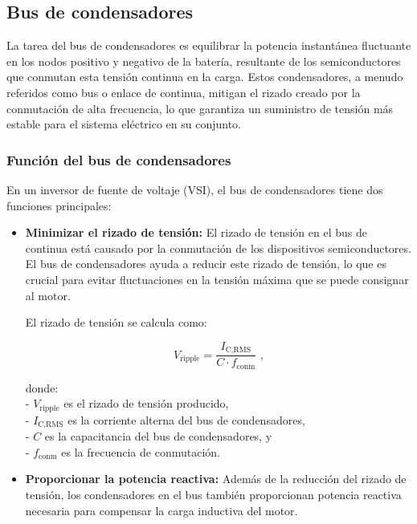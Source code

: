 \subsection{Bus de condensadores}

La tarea del bus de condensadores es equilibrar la potencia instantánea fluctuante en los nodos positivo y negativo de la batería, resultante de los semiconductores que conmutan esta tensión continua en la carga. Estos condensadores, a menudo referidos como bus o enlace de continua, mitigan el rizado creado por la conmutación de alta frecuencia, lo que garantiza un suministro de tensión más estable para el sistema eléctrico en su conjunto.

\subsubsection{Función del bus de condensadores}

En un inversor de fuente de voltaje (VSI), el bus de condensadores tiene dos funciones principales:

\begin{itemize}
	\item \textbf{Minimizar el rizado de tensión:} El rizado de tensión en el bus de continua está causado por la conmutación de los dispositivos semiconductores. El bus de condensadores ayuda a reducir este rizado de tensión, lo que es crucial para evitar fluctuaciones en la tensión máxima que se puede consignar al motor.
	
	El rizado de tensión se calcula como:
	
	\begin{equation}
	V_{\text{ripple}} = \frac{I_{\text{C,RMS}}}{C \cdot f_{\text{conm}}} \text{ ,}
	\end{equation}
	
	donde:\\
	- \( V_{\text{ripple}} \) es el rizado de tensión producido,\\
	- \( I_{\text{C,RMS}} \) es la corriente alterna del bus de condensadores,\\
	- \( C \) es la capacitancia del bus de condensadores, y\\
	- \( f_{\text{conm}} \) es la frecuencia de conmutación.\\
	
	\item \textbf{Proporcionar la potencia reactiva:} Además de la reducción del rizado de tensión, los condensadores en el bus también proporcionan potencia reactiva necesaria para compensar la carga inductiva del motor.
	
\end{itemize}

